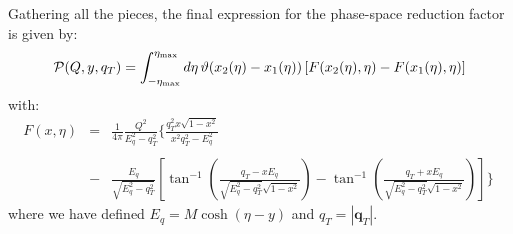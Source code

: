 \documentclass[10pt,a4paper]{article}
\begin{document}
Gathering all the pieces, the final expression for the phase-space
reduction factor is given by:
\begin{equation}\label{eq:finalformula}
  \mathcal{P}(Q,y,q_T)=\displaystyle \int_{-\eta_{\rm
      max}}^{\eta_{\rm
      max}}d\eta\,\vartheta(x_2(\eta)-x_1(\eta))\left[F(x_2(\eta),\eta)-F(x_1(\eta) ,\eta)\right]
\end{equation}
with:
\begin{equation}\label{eq:integrandF}
\begin{array}{rcl}
\displaystyle F(x ,\eta)&=&\displaystyle \frac{1}{4\pi}\frac{Q^2}{E_q^2-q_T^2}\Bigg\{\frac{q_T^2 x\sqrt{1-x^2}}{x^2 q_T^2-
  E_q^2}\\
\\
&-&\displaystyle \frac{E_q}{\sqrt{E_q^2-q_T^2}}\left[\tan^{-1}\left(\frac{q_T-
    xE_q}{\sqrt{E_q^2-q_T^2}\sqrt{1-x^2}}\right)-\displaystyle\tan^{-1}\left(\frac{q_T+
    xE_q}{\sqrt{E_q^2-q_T^2}\sqrt{1-x^2}}\right)\right]\Bigg\}\
\end{array}
\end{equation}
where we have defined $E_q = M\cosh(\eta-y)$ and
$q_T=|\mathbf{q}_T|$.
\end{document}
